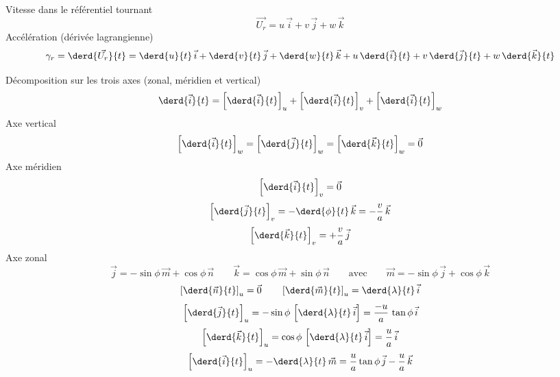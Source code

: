 \sk
Vitesse dans le référentiel tournant 
\[
\vec{U_r} = u\,\vec{i} + v\,\vec{j} + w\,\vec{k}
\]
\noindent Accélération (dérivée lagrangienne)
\[
\gamma_r = \derd{\vec{U_r}}{t}=\derd{u}{t}\,\vec{i}+\derd{v}{t}\,\vec{j}+\derd{w}{t}\,\vec{k} +u\,\derd{\vec{i}}{t}+v\,\derd{\vec{j}}{t}+w\,\derd{\vec{k}}{t}
\]


\sk
Décomposition sur les trois axes (zonal, méridien et vertical)
\[
\derd{\vec{i}}{t} = \left[ \derd{\vec{i}}{t} \right]_u + \left[ \derd{\vec{i}}{t} \right]_v + \left[ \derd{\vec{i}}{t} \right]_w
\]
\noindent Axe vertical
\[
\left[ \derd{\vec{i}}{t} \right]_w = \left[ \derd{\vec{j}}{t} \right]_w = \left[ \derd{\vec{k}}{t} \right]_w = \vec{0}
\]
\noindent Axe méridien
\[
\left[ \derd{\vec{i}}{t} \right]_v = \vec{0}
\]
\[
\left[ \derd{\vec{j}}{t} \right]_v = - \derd{\phi}{t} \, \vec{k} = - \dfrac{v}{a} \, \vec{k}
\]
\[
\left[ \derd{\vec{k}}{t} \right]_v = + \dfrac{v}{a} \, \vec{j}
\]
\noindent Axe zonal
\[
\vec{j} = -\sin\phi \, \vec{m} + \cos\phi \, \vec{n} \qquad \vec{k} =  \cos\phi \, \vec{m} + \sin\phi \, \vec{n} \qquad \textrm{avec} \qquad \vec{m} = -\sin\phi \, \vec{j} + \cos\phi \, \vec{k}
\]
\[
\left[ \derd{\vec{n}}{t} \right]_u = \vec{0} \qquad \left[ \derd{\vec{m}}{t} \right]_u = \derd{\lambda}{t} \, \vec{i}
\]
\[
\left[ \derd{\vec{j}}{t} \right]_u = -\sin\phi \, \left[ \derd{\lambda}{t} \, \vec{i} \right] = \dfrac{-u}{a} \, \tan\phi \, \vec{i}
\]
\[
\left[ \derd{\vec{k}}{t} \right]_u =  \cos\phi \, \left[ \derd{\lambda}{t} \, \vec{i} \right] = \dfrac{u}{a} \, \vec{i}
\]
\[
\left[ \derd{\vec{i}}{t} \right]_u = - \derd{\lambda}{t} \, \vec{m} = \dfrac{u}{a} \tan\phi \, \vec{j} - \dfrac{u}{a} \,\vec{k}
\]


